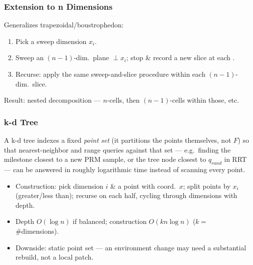 \subsubsection{Extension to n Dimensions}
Generalizes trapezoidal/boustrophedon:
\begin{enumerate}
\item Pick a sweep dimension $x_i$.
\item Sweep an $(n{-}1)$-dim.\ plane $\perp x_i$; stop \& record a new slice at each .
\item Recurse: apply the same sweep-and-slice procedure within each $(n{-}1)$-dim.\ slice.
\end{enumerate}
Result: nested decomposition — $n$-cells, then $(n{-}1)$-cells within those, etc.

\subsubsection{k-d Tree}
A k-d tree indexes a fixed \emph{point set} (it partitions the points themselves, not $F$) so that nearest-neighbor and range queries against that set --- e.g.\ finding the milestone closest to a new PRM sample, or the tree node closest to $q_{rand}$ in RRT --- can be answered in roughly logarithmic time instead of scanning every point.
\begin{itemize}
\item Construction: pick dimension $i$ \& a point with coord.\ $x$; split points by $x_i$ (greater/less than); recurse on each half, cycling through dimensions with depth.
\item Depth $O(\log n)$ if balanced; construction $O(kn\log n)$ ($k=$ \#dimensions).
\item Downside: static point set — an environment change may need a substantial rebuild, not a local patch.
\end{itemize}


